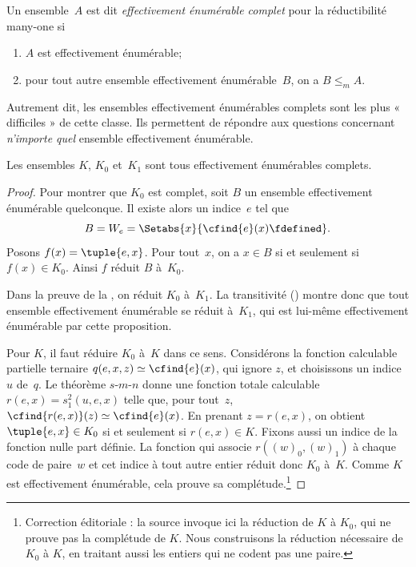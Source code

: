 \documentclass[../../../include/open-logic-section]{subfiles}
\begin{document}

\begin{defn}
Un ensemble~$A$ est dit \emph{effectivement
énumérable complet} pour la réductibilité
many-one si
\begin{enumerate}
\item $A$ est effectivement énumérable;
\item pour tout autre ensemble effectivement
  énumérable~$B$, on a $B\leq_m A$.
\end{enumerate}
\end{defn}

Autrement dit, les ensembles effectivement
énumérables complets sont les plus « difficiles »
de cette classe. Ils permettent de répondre aux
questions concernant \emph{n'importe quel}
ensemble effectivement énumérable.

\begin{thm}
Les ensembles $K$, $K_0$ et~$K_1$ sont tous
effectivement énumérables complets.
\end{thm}

\begin{proof}
Pour montrer que $K_0$ est complet, soit $B$
un ensemble effectivement énumérable quelconque.
Il existe alors un indice~$e$ tel que
\[
B = W_e = \Setabs{x}{\cfind{e}(x) \fdefined}.
\]
Posons $f(x)=\tuple{e,x}$. Pour tout~$x$,
on a $x\in B$ si et seulement si $f(x)\in K_0$.
Ainsi $f$ réduit $B$ à~$K_0$.

Dans la preuve de la , on réduit
$K_0$ à~$K_1$. La transitivité
() montre donc que
tout ensemble effectivement énumérable se
réduit à~$K_1$, qui est lui-même effectivement
énumérable par cette proposition.

Pour $K$, il faut réduire $K_0$ à~$K$ dans ce
sens. Considérons la fonction calculable partielle
ternaire $q(e,x,z)\simeq\cfind{e}(x)$, qui ignore
$z$, et choisissons un indice~$u$ de~$q$.
Le théorème $s$-$m$-$n$ donne une fonction
totale calculable $r(e,x)=s^2_1(u,e,x)$ telle que,
pour tout~$z$,
$\cfind{r(e,x)}(z)\simeq\cfind{e}(x)$.
En prenant $z=r(e,x)$, on obtient
$\tuple{e,x}\in K_0$ si et seulement si
$r(e,x)\in K$. Fixons aussi un indice de la
fonction nulle part définie. La fonction qui
associe $r((w)_0,(w)_1)$ à chaque code de
paire~$w$ et cet indice à tout autre entier
réduit donc $K_0$ à~$K$. Comme $K$ est
effectivement énumérable, cela prouve sa
complétude.\footnote{Correction éditoriale : la source invoque ici la réduction de $K$ à $K_0$, qui ne prouve pas la complétude de $K$. Nous construisons la réduction nécessaire de $K_0$ à $K$, en traitant aussi les entiers qui ne codent pas une paire.}
\end{proof}
\end{document}
